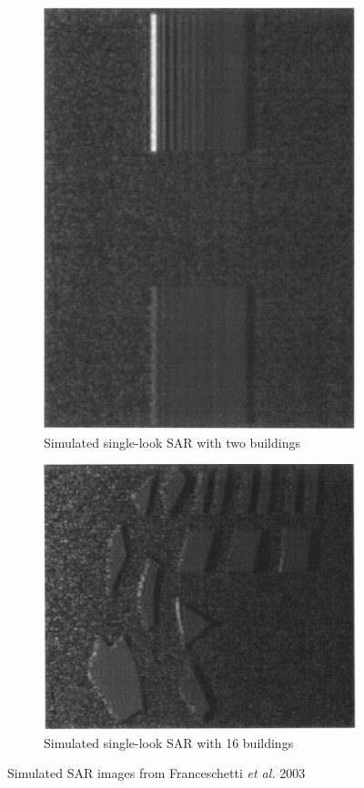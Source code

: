 \begin{figure}
\centering
\begin{subfigure}{.5\textwidth}
	\centering
	\includegraphics[width=0.9\linewidth]{../figures/franceschetti_2003_2_buildings}
	\caption{Simulated single-look SAR with two buildings}
	\label{fig:franceschetti_2003_2_buildings}
\end{subfigure}%
\begin{subfigure}{.5\textwidth}
	\centering
	\includegraphics[width=0.9\linewidth]{../figures/franceschetti_2003_16_buildings}	
	\caption{Simulated single-look SAR with 16 buildings}
	\label{fig:franceschetti_2003_16_buildings}
\end{subfigure}
\caption{Simulated SAR images from Franceschetti \textit{et al.} 2003 \cite{franceschettiSARRawSignal2003}}
\label{fig:franceschetti_2003_buildings}
	

\end{figure}
